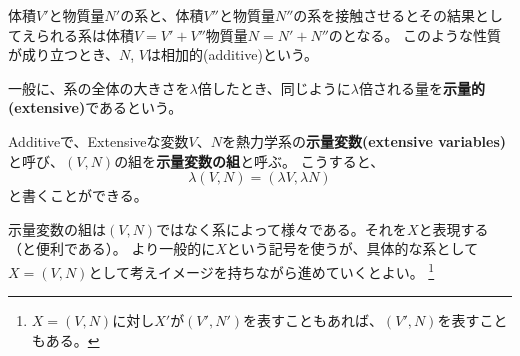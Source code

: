 体積$V'$と物質量$N'$の系と、体積$V''$と物質量$N''$の系を接触させるとその結果としてえられる系は体積$V=V'+V''$物質量$N=N'+N''$のとなる。
このような性質が成り立つとき、$N$, $V$は相加的(additive)という。

一般に、系の全体の大きさを$\lambda$倍したとき、同じように$\lambda$倍される量を\textbf{示量的(extensive)}であるという。

Additiveで、Extensiveな変数$V$、$N$を熱力学系の\textbf{示量変数(extensive variables)}と呼び、$(V, N)$の組を\textbf{示量変数の組}と呼ぶ。
こうすると、
\begin{equation}
  \lambda(V, N) = (\lambda V, \lambda N)
\end{equation}
と書くことができる。

示量変数の組は$(V, N)$ではなく系によって様々である。それを$X$と表現する（と便利である）。
より一般的に$X$という記号を使うが、具体的な系として$X=(V, N)$として考えイメージを持ちながら進めていくとよい。
\footnote{
  $X=(V, N)$に対し$X'$が$(V', N')$を表すこともあれば、$(V', N)$を表すこともある。
}
